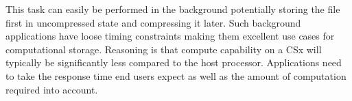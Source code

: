 
This task can easily be performed in the background potentially storing the file
first in uncompressed state and compressing it later. Such background
applications have loose timing constraints making them excellent use cases for
computational storage. Reasoning is that compute capability on a CSx will
typically be significantly less compared to the host processor. Applications
need to take the response time end users expect as well as the amount of
computation required into account.


